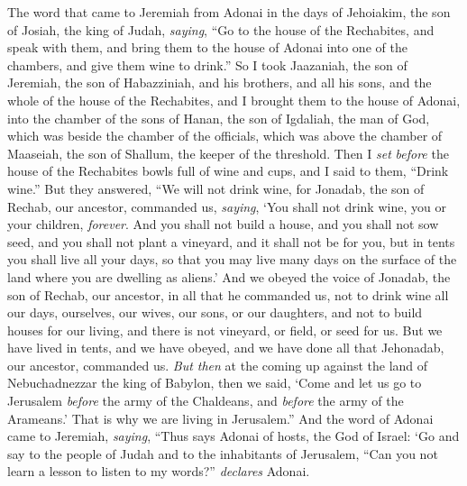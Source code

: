 \begin{biblechapter} %
 The word that came to Jeremiah from Adonai in the days of Jehoiakim, the son of Josiah, the king of Judah, \textit{saying},
\verse “Go to the house of the Rechabites, and speak with them, and bring them to the house of Adonai into one of the chambers, and give them wine to drink.”
\verse So I took Jaazaniah, the son of Jeremiah, the son of Habazziniah, and his brothers, and all his sons, and the whole of the house of the Rechabites,
\verse and I brought them to the house of Adonai, into the chamber of the sons of Hanan, the son of Igdaliah, the man of God, which was beside the chamber of the officials, which was above the chamber of Maaseiah, the son of Shallum, the keeper of the threshold.
\verse Then I \textit{set} \textit{before} the house of the Rechabites bowls full of wine and cups, and I said to them, “Drink wine.”
\verse But they answered, “We will not drink wine, for Jonadab, the son of Rechab, our ancestor, commanded us, \textit{saying}, ‘You shall not drink wine, you or your children, \textit{forever}.
\verse And you shall not build a house, and you shall not sow seed, and you shall not plant a vineyard, and it shall not be for you, but in tents you shall live all your days, so that you may live many days on the surface of the land where you are dwelling as aliens.’
\verse And we obeyed the voice of Jonadab, the son of Rechab, our ancestor, in all that he commanded us, not to drink wine all our days, ourselves, our wives, our sons, or our daughters,
\verse and not to build houses for our living, and there is not vineyard, or field, or seed for us.
\verse But we have lived in tents, and we have obeyed, and we have done all that Jehonadab, our ancestor, commanded us.
\verse \textit{But then} at the coming up against the land of Nebuchadnezzar the king of Babylon, then we said, ‘Come and let us go to Jerusalem \textit{before} the army of the Chaldeans, and \textit{before} the army of the Arameans.’ That is why we are living in Jerusalem.”
\verse And the word of Adonai came to Jeremiah, \textit{saying},
\verse “Thus says Adonai of hosts, the God of Israel: ‘Go and say to the people of Judah and to the inhabitants of Jerusalem, “Can you not learn a lesson to listen to my words?” \textit{declares} Adonai.

\end{biblechapter}
